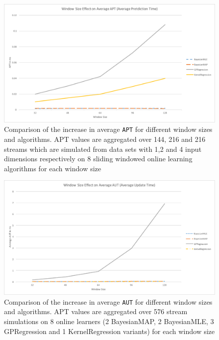 \begin{figure}[htbp]
  \centering
    \includegraphics[width=\linewidth]{./Figures/ws_on_apt_per_alg.pdf}
  \caption{Comparison of the increase in average \texttt{APT} for different window sizes and algorithms. APT values are aggregated over 144, 216 and 216 streams which are simulated from data sets with 1,2 and 4 input dimensions respectively on 8 sliding windowed online learning algorithms for each window size}
  \label{fig:ws_on_apt_per_alg}
\end{figure}

\begin{figure}[htbp]
  \centering
    \includegraphics[width=\linewidth]{./Figures/ws_on_aut_per_alg.pdf}
  \caption{Comparison of the increase in average \texttt{AUT} for different window sizes and algorithms. APT values are aggregated over 576 stream simulations on 8 online learners (2 BayesianMAP, 2 BayesianMLE, 3 GPRegression and 1 KernelRegression variants) for each window size}
  \label{fig:ws_on_aut_per_alg}
\end{figure}

